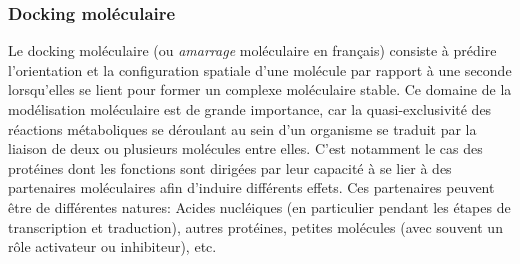 





\subsubsection{Docking moléculaire}

Le docking moléculaire (ou \textit{amarrage} moléculaire en français) consiste à prédire l'orientation et la configuration spatiale d'une molécule par rapport à une seconde lorsqu’elles se lient pour former un complexe moléculaire stable. Ce domaine de la modélisation moléculaire est de grande importance, car la quasi-exclusivité des réactions métaboliques se déroulant au sein d'un organisme se traduit par la liaison de deux ou plusieurs molécules entre elles. C'est notamment le cas des protéines dont les fonctions sont dirigées par leur capacité à se lier à des partenaires moléculaires afin d'induire différents effets. Ces partenaires peuvent être de différentes natures: Acides nucléiques (en particulier pendant les étapes de transcription et traduction), autres protéines, petites molécules (avec souvent un rôle activateur ou inhibiteur), etc.

